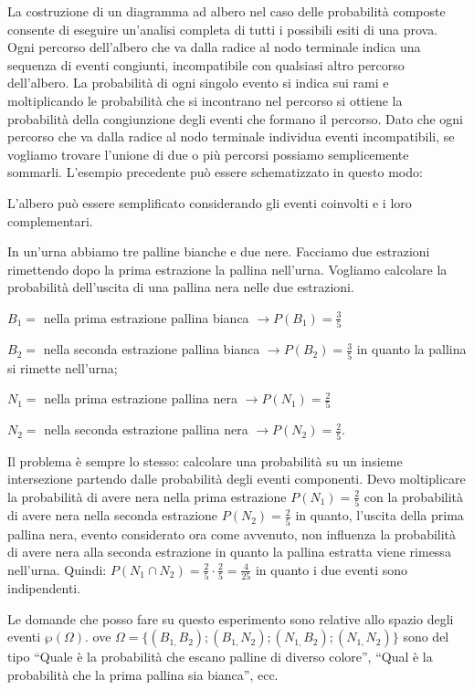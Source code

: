 La costruzione di un diagramma ad albero nel caso delle probabilità composte 
consente di eseguire un'analisi completa di tutti i possibili esiti di una 
prova. Ogni percorso dell'albero che va dalla radice al nodo terminale indica 
una sequenza di eventi congiunti, incompatibile con qualsiasi altro percorso 
dell'albero. La probabilità di ogni singolo evento si indica sui rami e 
moltiplicando le probabilità che si incontrano nel percorso si ottiene la 
probabilità della congiunzione degli eventi che formano il percorso. Dato che 
ogni percorso che va dalla radice al nodo terminale individua eventi 
incompatibili, se vogliamo trovare l'unione di due o più percorsi possiamo 
semplicemente sommarli.
L'esempio precedente può essere schematizzato in questo modo:
\begin{center}
 
\end{center}
L'albero può essere semplificato considerando gli eventi coinvolti e i loro 
complementari.

\begin{exrig}
\begin{esempio}
In un'urna abbiamo tre palline bianche e due nere. Facciamo due estrazioni 
rimettendo dopo la prima estrazione la pallina nell'urna. Vogliamo calcolare la 
probabilità dell'uscita di una pallina nera nelle due estrazioni.
\begin{itemize*}
\item $ B_{1}= $ nella prima estrazione pallina bianca $\to P(B_1)=\frac 3 5$
\item $ B_{2}= $ nella seconda estrazione pallina bianca $\to P(B_2)=\frac 3 5$ 
in quanto la pallina si rimette nell'urna;
\item $ N_{1}= $ nella prima estrazione pallina nera $\to P(N_1)=\frac 2 5$
\item $ N_{2}= $ nella seconda estrazione pallina nera $\to P(N_2)=\frac 2 5$.
\end{itemize*}
Il problema è sempre lo stesso: calcolare una probabilità su un insieme 
intersezione partendo dalle probabilità degli eventi componenti. Devo 
moltiplicare la probabilità di avere nera nella prima estrazione $P(N_1)=\frac 2 
5$ con la probabilità di avere nera nella seconda estrazione $P(N_2)=\frac 2 5$ 
in quanto, l'uscita della prima pallina nera, evento considerato ora come 
avvenuto, non influenza la probabilità di avere nera alla seconda estrazione in 
quanto la pallina estratta viene rimessa nell'urna. Quindi: $P(N_1\cap 
N_2)=\frac 2 5\cdot \frac 2 5=\frac 4{25}$ in quanto i due eventi sono 
indipendenti.
\begin{center}
 
\end{center}
Le domande che posso fare su questo esperimento sono relative allo spazio degli 
eventi $\wp (\Omega ).$ ove $\Omega 
=\{(B_{1,}B_2);(B_{1,}N_2);(N_{1,}B_2);(N_{1,}N_2)\}$ sono del tipo ``Quale è la 
probabilità che escano palline di diverso colore'', ``Qual è la probabilità che 
la prima pallina sia bianca'', ecc.
\end{esempio}
\end{exrig}

